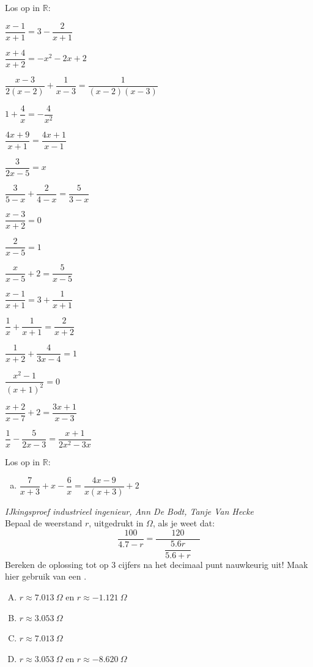 \documentclass[a4paper,12pt]{article}
\begin{document}
\begin{oefening} %
Los op in $\mathbb{R}$:
\begin{exlist}{2}
  \item $\dfrac{x-1}{x+1}=3-\dfrac{2}{x+1}$
  \item $\dfrac{x+4}{x+2}=-x^2-2x+2$
  \item $\dfrac{x-3}{2(x-2)}+\dfrac{1}{x-3}=\dfrac{1}{(x-2)(x-3)}$
  \item $1+\dfrac{4}{x}=-\dfrac{4}{x^2}$
  \item $\dfrac{4x+9}{x+1}=\dfrac{4x+1}{x-1}$
  \item $\dfrac{3}{2x-5}=x$
  \item $\dfrac{3}{5-x}+\dfrac{2}{4-x}=\dfrac{5}{3-x}$
  \item $\dfrac{x-3}{x+2}=0$
  \item $\dfrac{2}{x-5}=1$
  \item $\dfrac{x}{x-5}+2=\dfrac{5}{x-5}$
  \item $\dfrac{x-1}{x+1}=3+\dfrac{1}{x+1}$
  \item $\dfrac{1}{x}+\dfrac{1}{x+1}=\dfrac{2}{x+2}$
  \item $\dfrac{1}{x+2}+\dfrac{4}{3x-4}=1$
  \item $\dfrac{x^2-1}{(x+1)^2}=0$
  \item $\dfrac{x+2}{x-7}+2=\dfrac{3x+1}{x-3}$
  \item $\dfrac{1}{x}-\dfrac{5}{2x-3}=\dfrac{x+1}{2x^2-3x}$
\end{exlist}
\end{oefening}

\begin{oefening} %
Los op in $\mathbb{R}$:\\
\begin{enumerate}[(a)]
  \itemsep.4em
  \item $\dfrac{7}{x+3} + x - \dfrac{6}{x} = \dfrac{4x-9}{x(x+3)} + 2$
\end{enumerate}
\end{oefening}

\begin{oefening}{\scriptsize\em IJkingsproef industrieel ingenieur, Ann De Bodt, Tanje Van Hecke}\\
Bepaal de weerstand $r$, uitgedrukt in $\Omega$, als je weet dat:
$$\dfrac{100}{4.7-r}=\dfrac{120}{\quad\dfrac{5.6r}{5.6+r}\quad}$$
Bereken de oplossing tot op 3 cijfers na het decimaal punt nauwkeurig uit!
Maak hier gebruik van een .
\begin{enumerate}[(A)]
  \itemsep.5em
  \item $r \approx 7.013\ \Omega$ en $r \approx -1.121\ \Omega$
  \item $r \approx 3.053\ \Omega$
  \item $r \approx 7.013\ \Omega$
  \item $r \approx 3.053\ \Omega$ en $r \approx -8.620\ \Omega$
\end{enumerate}
\end{oefening}
\end{document}
